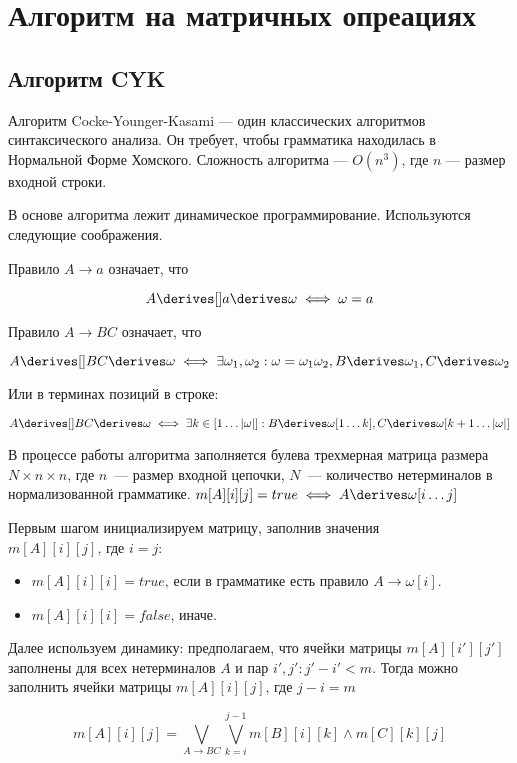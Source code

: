 \section{Алгоритм на матричных опреациях}

\subsection{Алгоритм CYK}

Алгоритм Cocke-Younger-Kasami --- один классических алгоритмов синтаксического анализа. 
Он требует, чтобы грамматика находилась в Нормальной Форме Хомского. 
Сложность алгоритма --- $O(n^3)$, где $n$ --- размер входной строки. 

В основе алгоритма лежит динамическое программирование. 
Используются следующие соображения. 

Правило $A \to a$ означает, что 

\[
  A \derives[] a \derives \omega \iff \omega = a\]
  
Правило $A \to B C$ означает, что 

\[A \derives[] B C \derives \omega \iff \exists \omega_1, \omega_2 : \omega = \omega_1 \omega_2, B \derives \omega_1, C \derives \omega_2\]

Или в терминах позиций в строке: 

\[A \derives[] B C \derives \omega \iff \exists k \in [1 \dots |\omega|] : B \derives \omega[1 \dots k], C \derives \omega[k+1 \dots |\omega|]\]

В процессе работы алгоритма заполняется булева трехмерная матрица размера $N \times n \times n$, где $n$~---  размер входной цепочки, $N$~--- количество нетерминалов в нормализованной грамматике. 
$m[A][i][j] = true \iff A \derives \omega[i \dots j]$

Первым шагом инициализируем матрицу, заполнив значения $m[A][i][j] \text{, где }i = j$: 

\begin{itemize}
  \item $m[A][i][i] = true \text{, если в грамматике есть правило } A \to \omega[i]$.
  \item $m[A][i][i] = false$, иначе.
\end{itemize}

Далее используем динамику: предполагаем, что ячейки матрицы $m[A][i'][j']$ заполнены для всех нетерминалов $A$ и пар $i', j': j' - i' < m$.
Тогда можно заполнить ячейки матрицы $m[A][i][j] \text{, где } j - i = m$

\[ m[A][i][j] = \bigvee_{A \to B C}^{}{\bigvee_{k=i}^{j-1}{m[B][i][k] \wedge m[C][k][j]}} \]

